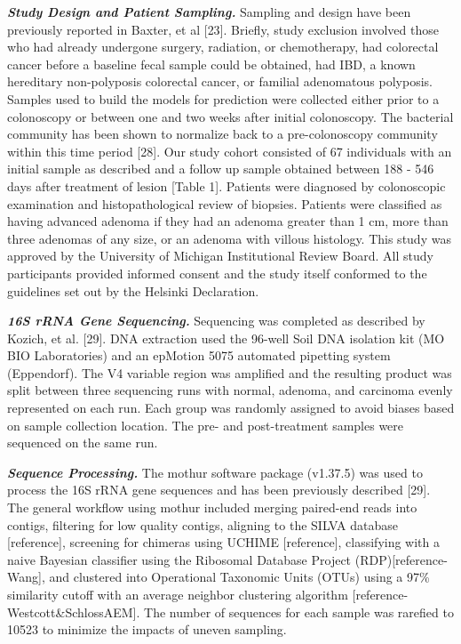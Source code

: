\documentclass[12pt,]{article}
\begin{document}
\textbf{\emph{Study Design and Patient Sampling.}} Sampling and design
have been previously reported in Baxter, et al {[}23{]}. Briefly, study
exclusion involved those who had already undergone surgery, radiation,
or chemotherapy, had colorectal cancer before a baseline fecal sample
could be obtained, had IBD, a known hereditary non-polyposis colorectal
cancer, or familial adenomatous polyposis. Samples used to build the
models for prediction were collected either prior to a colonoscopy or
between one and two weeks after initial colonoscopy. The bacterial
community has been shown to normalize back to a pre-colonoscopy
community within this time period {[}28{]}. Our study cohort consisted
of 67 individuals with an initial sample as described and a follow up
sample obtained between 188 - 546 days after treatment of lesion
{[}Table 1{]}. Patients were diagnosed by colonoscopic examination and
histopathological review of biopsies. Patients were classified as having
advanced adenoma if they had an adenoma greater than 1 cm, more than
three adenomas of any size, or an adenoma with villous histology. This
study was approved by the University of Michigan Institutional Review
Board. All study participants provided informed consent and the study
itself conformed to the guidelines set out by the Helsinki Declaration.

\textbf{\emph{16S rRNA Gene Sequencing.}} Sequencing was completed as
described by Kozich, et al. {[}29{]}. DNA extraction used the 96-well
Soil DNA isolation kit (MO BIO Laboratories) and an epMotion 5075
automated pipetting system (Eppendorf). The V4 variable region was
amplified and the resulting product was split between three sequencing
runs with normal, adenoma, and carcinoma evenly represented on each run.
Each group was randomly assigned to avoid biases based on sample
collection location. The pre- and post-treatment samples were sequenced
on the same run.

\textbf{\emph{Sequence Processing.}} The mothur software package
(v1.37.5) was used to process the 16S rRNA gene sequences and has been
previously described {[}29{]}. The general workflow using mothur
included merging paired-end reads into contigs, filtering for low
quality contigs, aligning to the SILVA database {[}reference{]},
screening for chimeras using UCHIME {[}reference{]}, classifying with a
naive Bayesian classifier using the Ribosomal Database Project
(RDP){[}reference-Wang{]}, and clustered into Operational Taxonomic
Units (OTUs) using a 97\% similarity cutoff with an average neighbor
clustering algorithm {[}reference-Westcott\&SchlossAEM{]}. The number of
sequences for each sample was rarefied to 10523 to minimize the impacts
of uneven sampling.
\end{document}
